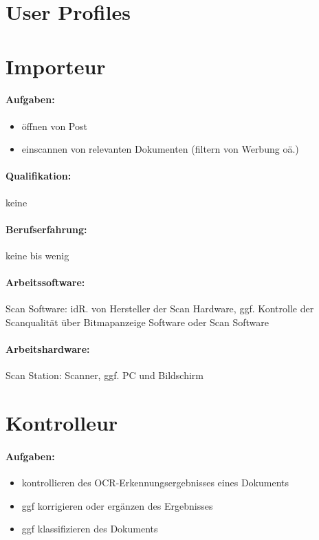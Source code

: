 \documentclass[11pt,oneside,a4paper,notitlepage]{article}
\begin{document}
%

\section{User Profiles}


\section{Importeur}

\paragraph*{Aufgaben: }
\begin{itemize}
\item öffnen von Post
\item einscannen von relevanten Dokumenten (filtern von Werbung oä.)
\end{itemize}
%
%
\paragraph*{Qualifikation: } keine
%
\paragraph*{Berufserfahrung: } keine bis wenig
%
\paragraph*{Arbeitssoftware: } Scan Software: idR. von Hersteller der Scan Hardware, ggf. Kontrolle der Scanqualität über
Bitmapanzeige Software oder Scan Software
%
\paragraph*{Arbeitshardware: } Scan Station: Scanner, ggf. PC und Bildschirm

%
%
\section{Kontrolleur}
\paragraph*{Aufgaben: }
\begin{itemize}
\item kontrollieren des OCR-Erkennungsergebnisses eines Dokuments
\item ggf korrigieren oder ergänzen des Ergebnisses
\item ggf klassifizieren des Dokuments
\end{itemize}
%
%
\end{document}
